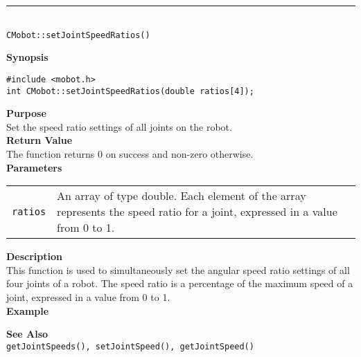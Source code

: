 \noindent
\vspace{5pt}
\rule{4.5in}{0.015in}\\
\noindent
{\LARGE \texttt{CMobot::setJointSpeedRatios()}}\\
{}

\noindent
{\bf Synopsis}
\vspace{-8pt}
\begin{verbatim}
#include <mobot.h>
int CMobot::setJointSpeedRatios(double ratios[4]);
\end{verbatim}

\noindent
{\bf Purpose}\\
Set the speed ratio settings of all joints on the robot.\\

\noindent
{\bf Return Value}\\
The function returns 0 on success and non-zero otherwise.\\

\noindent
{\bf Parameters}
\vspace{-0.1in}
\begin{description}
\item               
\begin{tabular}{p{10 mm}p{145 mm}}
\texttt{ratios} & An array of type double. Each element of the array
represents the speed ratio for a joint, expressed in a value from 0 to 1. \\
\end{tabular}
\end{description}

\noindent
{\bf Description}\\
This function is used to simultaneously set the angular speed ratio settings of
all four joints of a robot. The speed ratio is a percentage of the maximum
speed of a joint, expressed in a value from 0 to 1.\\

\noindent
{\bf Example}\\
\noindent

\noindent
{\bf See Also}\\
\texttt{getJointSpeeds(), setJointSpeed(), getJointSpeed()}

